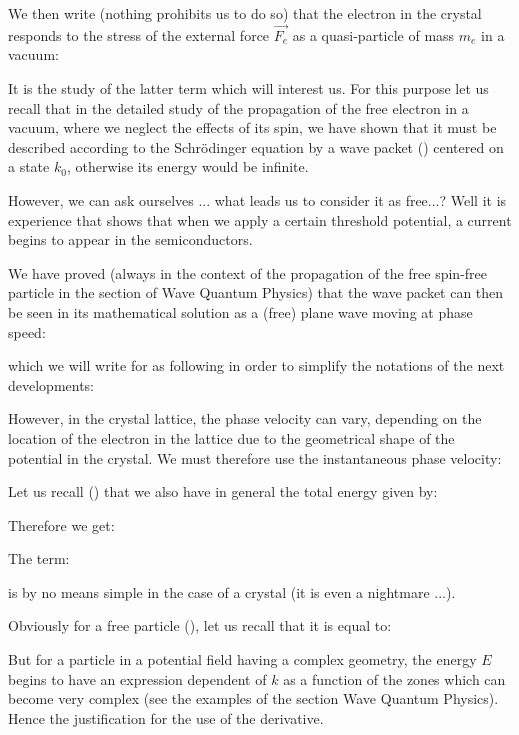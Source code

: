 	We then write (nothing prohibits us to do so) that the electron in the crystal responds to the stress of the external force $\vec{F_e}$ as a quasi-particle of mass $m_e$ in a vacuum:
	
	It is the study of the latter term which will interest us. For this purpose let us recall that in the detailed study of the propagation of the free electron in a vacuum, where we neglect the effects of its spin, we have shown that it must be described according to the Schrödinger equation by a wave packet () centered on a state $k_0$, otherwise its energy would be infinite.

	However, we can ask ourselves ... what leads us to consider it as free...? Well it is experience that shows that when we apply a certain threshold potential, a current begins to appear in the semiconductors.

	We have proved (always in the context of the propagation of the free spin-free particle in the section of Wave Quantum Physics) that the wave packet can then be seen in its mathematical solution as a (free) plane wave moving at phase speed:
	
	which we will write for as following in order to simplify the notations of the next developments:
	
	However, in the crystal lattice, the phase velocity can vary, depending on the location of the electron in the lattice due to the geometrical shape of the potential in the crystal. We must therefore use the instantaneous phase velocity:
	
	Let us recall () that we also have in general the total energy given by:
	
	Therefore we get:
	
	The term:
	
	is by no means simple in the case of a crystal (it is even a nightmare ...).

	Obviously for a free particle (), let us recall that it is equal to:
	
	But for a particle in a potential field having a complex geometry, the energy $E$ begins to have an expression dependent of $k$ as a function of the zones which can become very complex (see the examples of the section Wave Quantum Physics). Hence the justification for the use of the derivative.

